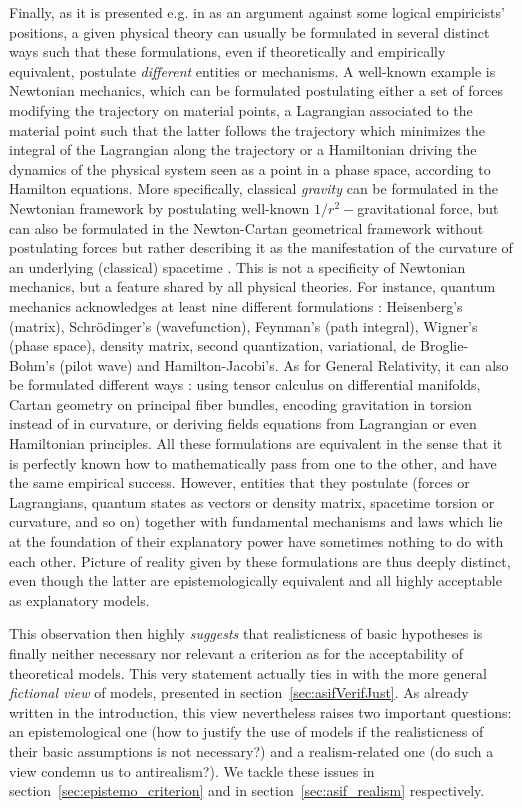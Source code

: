 \documentclass[a4paper,11pt]{article}
\theoremstyle{definition}
\begin{document}
Finally, as it is presented e.g. in \citep{Suppe2000} as an argument against some logical empiricists' positions, a given physical theory can usually be formulated in several distinct ways such that these formulations, even if theoretically and empirically equivalent, postulate \textit{different} entities or mechanisms. A well-known example is Newtonian mechanics, which can be formulated postulating either a set of forces modifying the trajectory on material points, a Lagrangian associated to the material point such that the latter follows the trajectory which minimizes the integral of the Lagrangian along the trajectory or a Hamiltonian driving the dynamics of the physical system seen as a point in a phase space, according to Hamilton equations. More specifically, classical \textit{gravity} can be formulated in the Newtonian framework by postulating well-known $1/r^2-$gravitational force, but can also be formulated in the Newton-Cartan geometrical framework without postulating forces but rather describing it as the manifestation of the curvature of an underlying (classical) spacetime \citep[Chapter~1]{Ehlers1973}. This is not a specificity of Newtonian mechanics, but a feature shared by all physical theories. For instance, quantum mechanics acknowledges at least nine different formulations \citep{Styer2002}: Heisenberg's (matrix), Schrödinger's (wavefunction), Feynman's (path integral), Wigner's (phase space), density matrix, second quantization, variational, de Broglie-Bohm's (pilot wave) and Hamilton-Jacobi's. As for General Relativity, it can also be formulated different ways \citep{Goeckeler2011, Krasnov2020, Arnowitt2008}: using tensor calculus on differential manifolds, Cartan geometry on principal fiber bundles, encoding gravitation in torsion instead of in curvature, or deriving fields equations from Lagrangian or even Hamiltonian principles. All these formulations are equivalent in the sense that it is perfectly known how to mathematically pass from one to the other, and have the same empirical success. However, entities that they postulate (forces or Lagrangians, quantum states as vectors or density matrix, spacetime torsion or curvature, and so on) together with fundamental mechanisms and laws which lie at the foundation of their explanatory power have sometimes nothing to do with each other. Picture of reality given by these formulations are thus deeply distinct, even though the latter are epistemologically equivalent and all highly acceptable as explanatory models. 

This observation then highly \textit{suggests} that realisticness of basic hypotheses is finally neither necessary nor relevant a criterion as for the acceptability of theoretical models. This very statement actually ties in with the more general \textit{fictional view} of models, presented in section~\ref{sec:asifVerifJust}. As already written in the introduction, this view nevertheless raises two important questions: an epistemological one (how to justify the use of models if the realisticness of their basic assumptions is not necessary?) and a realism-related one (do such a view condemn us to antirealism?). We tackle these issues in section~\ref{sec:epistemo_criterion} and in section~\ref{sec:asif_realism} respectively.
\end{document}
